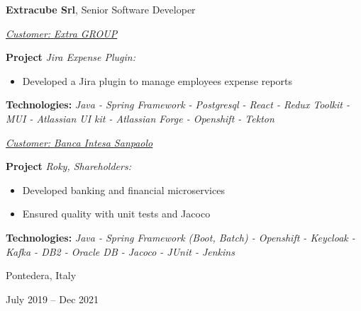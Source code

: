 \documentclass[10pt, a4paper]{article}
\newenvironment{highlights}{
    \begin{itemize}[
        topsep=0.10 cm,
        parsep=0.10 cm,
        partopsep=0pt,
        itemsep=0pt,
        leftmargin=0.4 cm + 10pt
    ]
}{
    \end{itemize}
} %
\newenvironment{twocolentry}[2][]{
    \onecolentry
    \def\secondColumn{#2}
    \setcolumnwidth{\fill, 4.5 cm}
    \begin{paracol}{2}
}{
    \switchcolumn \raggedleft \secondColumn
    \end{paracol}
    \endonecolentry
} %
\begin{document}
        \begin{twocolentry}{
            \fontsize{14}{18}Pontedera, Italy

        July 2019 – Dec 2021
            \normalsize
        }
            \fontsize{12}{16}
            \textcolor{secondaryColor}{\faBriefcase\hspace{4pt}\textbf{Extracube Srl},} Senior Software Developer
            \normalsize

            \vspace{0.10 cm}
                \vspace{0.10 cm}

                \textcolor{tertiaryColor}{\faAngleDoubleRight\hspace{0.1cm}\underline{\textit{Customer:} \textit{Extra GROUP}}}

                \vspace{0.2cm}
                \textbf{Project \faAngleRight} \textit{Jira Expense Plugin:}

                \begin{highlights}
                        \item Developed a Jira plugin to manage employees expense reports
                \end{highlights}
                \faBuffer
                \textbf{ Technologies:} \textit{Java - Spring Framework - Postgresql - React - Redux Toolkit - MUI - Atlassian UI kit - Atlassian Forge - Openshift - Tekton}

                \vspace{0.10 cm}

                \vspace{0.10 cm}

                \textcolor{tertiaryColor}{\faAngleDoubleRight\hspace{0.1cm}\underline{\textit{Customer:} \textit{Banca Intesa Sanpaolo}}}

                \vspace{0.2cm}
                \textbf{Project \faAngleRight} \textit{Roky, Shareholders:}

                \begin{highlights}
                        \item Developed banking and financial microservices
                        \item Ensured quality with unit tests and Jacoco
                \end{highlights}
                \faBuffer
                \textbf{ Technologies:} \textit{Java - Spring Framework (Boot, Batch) - Openshift - Keycloak - Kafka - DB2 - Oracle DB - Jacoco - JUnit - Jenkins}

                \vspace{0.10 cm}

        \end{twocolentry}
\end{document}
